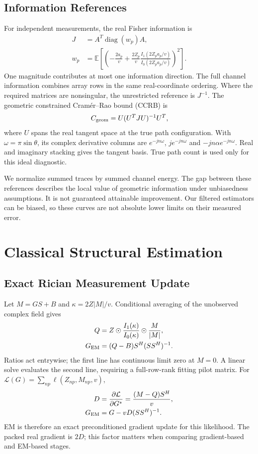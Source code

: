 \documentclass[10pt,journal,letterpaper]{IEEEtran}
\DeclareMathOperator{\diag}{diag}
\begin{document}
\subsection{Information References}
For independent measurements, the real Fisher information is
\begin{align}
 J&=A^T\diag(w_p)A,\nonumber\\
 w_p&=\mathbb E\!\left[\left(-\frac{2a_p}{v}+\frac{2Z_p}{v}
 \frac{I_1(2Z_pa_p/v)}{I_0(2Z_pa_p/v)}\right)^2\right].
\end{align}
One magnitude contributes at most one information direction. The full channel information combines array rows in the same real-coordinate ordering. Where the required matrices are nonsingular, the unrestricted reference is $J^{-1}$. The geometric constrained Cram\'er--Rao bound (CCRB) is~\cite{stoica1998}
\begin{equation}
 C_{\rm geom}=U(U^TJU)^{-1}U^T,
 \label{eq:ccrb}
\end{equation}
where $U$ spans the real tangent space at the true path configuration. With $\omega=\pi\sin\theta$, its complex derivative columns are $e^{-jn\omega}$, $je^{-jn\omega}$ and $-jn\alpha e^{-jn\omega}$. Real and imaginary stacking gives the tangent basis. True path count is used only for this ideal diagnostic.

We normalize summed traces by summed channel energy. The gap between these references describes the local value of geometric information under unbiasedness assumptions. It is not guaranteed attainable improvement. Our filtered estimators can be biased, so these curves are not absolute lower limits on their measured error.

\section{Classical Structural Estimation}
\subsection{Exact Rician Measurement Update}
Let $M=GS+B$ and $\kappa=2Z|M|/v$. Conditional averaging of the unobserved complex field gives
\begin{align}
 Q&=Z\odot\frac{I_1(\kappa)}{I_0(\kappa)}\odot\frac{M}{|M|},\nonumber\\
 G_{\rm EM}&=(Q-B)S^H(SS^H)^{-1}.
 \label{eq:em}
\end{align}
Ratios act entrywise; the first line has continuous limit zero at $M=0$. A linear solve evaluates the second line, requiring a full-row-rank fitting pilot matrix. For $\mathcal L(G)=\sum_{np}\ell(Z_{np},M_{np},v)$,
\begin{align}
 D&=\frac{\partial\mathcal L}{\partial G^*}=\frac{(M-Q)S^H}{v},\nonumber\\
 G_{\rm EM}&=G-vD(SS^H)^{-1}.
\end{align}
EM is therefore an exact preconditioned gradient update for this likelihood. The packed real gradient is $2D$; this factor matters when comparing gradient-based and EM-based stages.
\end{document}
